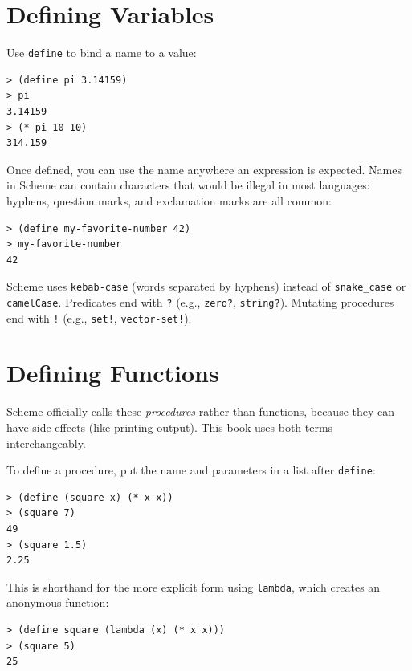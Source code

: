 \section{Defining Variables}

Use \texttt{define} to bind a name to a value:

\begin{lstlisting}[style=repl]
> (define pi 3.14159)
> pi
3.14159
> (* pi 10 10)
314.159
\end{lstlisting}

Once defined, you can use the name anywhere an expression is expected. Names in Scheme can contain characters that would be illegal in most languages: hyphens, question marks, and exclamation marks are all common:

\begin{lstlisting}[style=repl]
> (define my-favorite-number 42)
> my-favorite-number
42
\end{lstlisting}

\begin{note}
Scheme uses \texttt{kebab-case} (words separated by hyphens) instead of \texttt{snake\_case} or \texttt{camelCase}. Predicates end with \texttt{?} (e.g., \texttt{zero?}, \texttt{string?}). Mutating procedures end with \texttt{!} (e.g., \texttt{set!}, \texttt{vector-set!}).
\end{note}

\section{Defining Functions}

Scheme officially calls these \emph{procedures} rather than functions, because they can have side effects (like printing output). This book uses both terms interchangeably.

To define a procedure, put the name and parameters in a list after \texttt{define}:

\begin{lstlisting}[style=repl]
> (define (square x) (* x x))
> (square 7)
49
> (square 1.5)
2.25
\end{lstlisting}

This is shorthand for the more explicit form using \texttt{lambda}, which creates an anonymous function:

\begin{lstlisting}[style=repl]
> (define square (lambda (x) (* x x)))
> (square 5)
25
\end{lstlisting}

